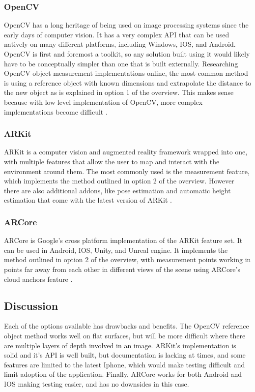 \documentclass[onecolumn, draftclsnofoot,10pt, compsoc]{IEEEtran}
\begin{document}
\subsubsection{OpenCV}
OpenCV has a long heritage of being used on image processing systems since the early days of computer vision. It has a very complex API that can be used natively on many different platforms, including Windows, IOS, and Android. OpenCV is first and foremost a toolkit, so any solution built using it would likely have to be conceptually simpler than one that is built externally. Researching OpenCV object measurement implementations online, the most common method is using a reference object with known dimensions and extrapolate the distance to the new object as is explained in option 1 of the overview. This makes sense because with low level implementation of OpenCV, more complex implementations become difficult \cite{openCV}. 

\subsubsection{ARKit}
ARKit is a computer vision and augmented reality framework wrapped into one, with multiple features that allow the user to map and interact with the environment around them. The most commonly used is the measurement feature, which implements the method outlined in option 2 of the overview. However there are also additional addons, like pose estimation and automatic height estimation that come with the latest version of ARKit \cite{ARKit}. 

\subsubsection{ARCore}
ARCore is Google's cross platform implementation of the ARKit feature set. It can be used in Android, IOS, Unity, and Unreal engine. It implements the method outlined in option 2 of the overview, with measurement points working in points far away from each other in different views of the scene using ARCore's cloud anchors feature \cite{ARCore}.

\subsection{Discussion}

Each of the options available has drawbacks and benefits. The OpenCV reference object method works well on flat surfaces, but will be more difficult where there are multiple layers of depth involved in an image. ARKit's implementation is solid and it's API is well built, but documentation is lacking at times, and some features are limited to the latest Iphone, which would make testing difficult and limit adoption of the application. Finally, ARCore works for both Android and IOS making testing easier, and has no downsides in this case.
\end{document}
